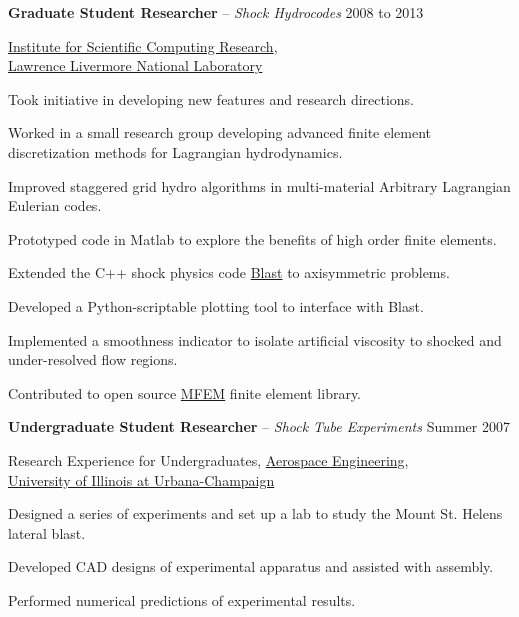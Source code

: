 \documentclass[10pt]{article}
\newenvironment{innerlist}[1][\enskip\textbullet]%
        {\begin{compactitem}[#1]}{\end{compactitem}}
\begin{document}
\textbf{Graduate Student Researcher} -- \emph{Shock Hydrocodes} \hfill {2008 to 2013}
\begin{innerlist}

\item[] \href{http://iscr.llnl.gov/}{Institute for Scientific Computing Research},\\
        \href{http://www.llnl.gov/}{Lawrence Livermore National Laboratory}
\begin{innerlist}
\item Took initiative in developing new features and research directions.
\item Worked in a small research group developing advanced finite element discretization methods for Lagrangian hydrodynamics.
\item Improved staggered grid hydro algorithms in multi-material Arbitrary Lagrangian Eulerian codes.
\item Prototyped code in Matlab to explore the benefits of high order finite elements.
\item Extended the C++ shock physics code \href{https://computation.llnl.gov/casc/blast/blast.html}{Blast} to axisymmetric problems.
\item Developed a Python-scriptable plotting tool to interface with Blast.
\item Implemented a smoothness indicator to isolate artificial viscosity to shocked and under-resolved flow regions.
\item Contributed to open source \href{http://www.mfem.org/}{MFEM} finite element library.
\end{innerlist}
\end{innerlist}

\bigskip
\pagebreak

\textbf{Undergraduate Student Researcher} -- \emph{Shock Tube Experiments} \hfill {Summer 2007}
\begin{innerlist}

\item[] {Research Experience for Undergraduates},
        \href{http://www.ae.uiuc.edu/}{Aerospace Engineering},\\
        \href{http://www.uiuc.edu/}{University of Illinois at Urbana-Champaign}
\begin{innerlist}
\item Designed a series of experiments and set up a lab to study the Mount St. Helens lateral blast.
\item Developed CAD designs of experimental apparatus and assisted with assembly.
\item Performed numerical predictions of experimental results.
\end{innerlist}
\end{innerlist}
\end{document}
